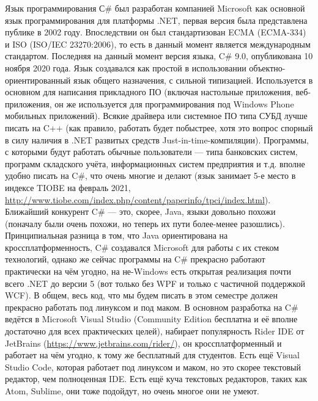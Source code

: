 \documentclass[a5paper]{article}
\begin{document}
Язык программирования С\# был разработан компанией Microsoft как основной язык программирования для платформы .NET, первая версия была представлена публике в 2002 году. Впоследствии он был стандартизован ECMA (ECMA-334) и ISO (ISO/IEC 23270:2006), то есть в данный момент является международным стандартом. Последняя на данный момент версия языка, C\# 9.0, опубликована 10 ноября 2020 года. Язык создавался как простой в использовании объектно-ориентированный язык общего назначения, с сильной типизацией. Используется в основном для написания прикладного ПО (включая настольные приложения, веб-приложения, он же используется для программирования под Windows Phone мобильных приложений). Всякие драйвера или системное ПО типа СУБД лучше писать на C++ (как правило, работать будет побыстрее, хотя это вопрос спорный в силу наличия в .NET развитых средств Just-in-time-компиляции). Программы, с которыми будут работать обычные пользователи --- типа банковских систем, программ складского учёта, информационных систем предприятия и т.д. вполне удобно писать на C\#, что очень многие и делают (язык занимает 5-е место в индексе TIOBE на февраль 2021, \url{http://www.tiobe.com/index.php/content/paperinfo/tpci/index.html}). Ближайший конкурент C\# --- это, скорее, Java, языки довольно похожи (поначалу были очень похожи, но теперь их пути более-менее разошлись). Принципиальная разница в том, что Java ориентирована на кроссплатформенность, C\# создавался Microsoft для работы с их стеком технологий, однако же сейчас программы на C\# прекрасно работают практически на чём угодно, на не-Windows есть открытая реализация почти всего .NET до версии 5 (вот только без WPF и только с частичной поддержкой WCF). В общем, весь код, что мы будем писать в этом семестре должен прекрасно работать под линуксом и под маком. В основном разработка на C\# ведётся в Microsoft Visual Studio (Community Edition бесплатна и её вполне достаточно для всех практических целей), набирает популярность Rider IDE от JetBrains (\url{https://www.jetbrains.com/rider/}), он кроссплатформенный и работает на чём угодно, к тому же бесплатный для студентов. Есть ещё Visual Studio Code, которая работает под линуксом и маком, но это скорее текстовый редактор, чем полноценная IDE. Есть ещё куча текстовых редакторов, таких как Atom, Sublime, они тоже подойдут, но очень многое они не умеют.
\end{document}
